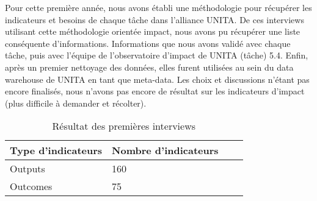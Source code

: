 Pour cette première année, nous avons établi une méthodologie pour récupérer les indicateurs et besoins de chaque tâche dans l'alliance UNITA. De ces interviews utilisant cette méthodologie orientée impact, nous avons pu récupérer une liste conséquente d'informations. Informations que nous avons validé avec chaque tâche, puis avec l'équipe de l'observatoire d'impact de UNITA (tâche) 5.4. Enfin, après un premier nettoyage des données, elles furent utilisées au sein du data warehouse de UNITA en tant que meta-data. Les choix et discussions n'étant pas encore finalisés, nous n'avons pas encore de résultat sur les indicateurs d'impact (plus difficile à demander et récolter). 
\begin{table}[h]
  \caption{Résultat des premières interviews}
  \begin{center}
    \begin{tabular}{|l|l|l|l|} \hline
    \textbf{Type d'indicateurs} & \textbf{Nombre d'indicateurs} \\ \hline
    Outputs & 160 \\ \hline
    Outcomes & 75 \\ \hline
    \end{tabular}
  \end{center}
\end{table}